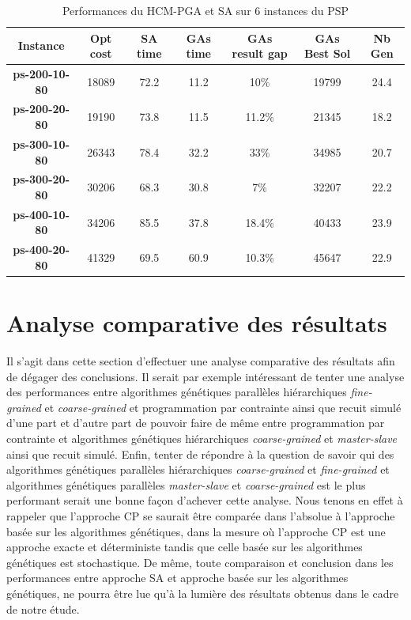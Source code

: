\documentclass[12pt,a4paper]{article}
\begin{document}
	\begin{table}[h]
		\centering
		\begin{tabular}{|c|c|c|c|c|c|c|}
			\hline
			\textbf{Instance} & \textbf{Opt cost} & \textbf{SA time} & \textbf{GAs time} & \textbf{GAs result gap} & \textbf{GAs Best Sol} & \textbf{Nb Gen}\\
			\hline
			\textbf{ps-200-10-80} & 18089 & 72.2 & 11.2 & 10\% & 19799 & 24.4 \\
			\textbf{ps-200-20-80} & 19190 & 73.8 & 11.5 & 11.2\% & 21345 & 18.2 \\
			\textbf{ps-300-10-80} & 26343 & 78.4 & 32.2 & 33\% & 34985 & 20.7 \\
			\textbf{ps-300-20-80} & 30206 & 68.3 & 30.8 & 7\% & 32207 & 22.2 \\
			\textbf{ps-400-10-80} & 34206 & 85.5 & 37.8 & 18.4\% & 40433 & 23.9 \\
			\textbf{ps-400-20-80} & 41329 & 69.5 & 60.9 & 10.3\% & 45647 & 22.9 \\
			\hline
		\end{tabular}	
		\caption{Performances du HCM-PGA et SA sur 6 instances du PSP}	
		\label{tab:hcm_pga_sa}	
	\end{table}					
	
		\section{Analyse comparative des résultats}
		Il s'agit dans cette section d'effectuer une analyse comparative des résultats afin de dégager des conclusions. Il serait par exemple intéressant de tenter une analyse des performances entre algorithmes génétiques parallèles hiérarchiques \emph{fine-grained} et \emph{coarse-grained} et programmation par contrainte ainsi que recuit simulé d'une part et d'autre part de pouvoir faire de même entre programmation par contrainte et algorithmes génétiques hiérarchiques \emph{coarse-grained} et \emph{master-slave} ainsi que recuit simulé. Enfin, tenter de répondre à la question de savoir qui des algorithmes génétiques parallèles hiérarchiques \emph{coarse-grained} et \emph{fine-grained} et algorithmes génétiques parallèles \emph{master-slave} et \emph{coarse-grained} est le plus performant serait une bonne façon d'achever cette analyse. Nous tenons en effet à rappeler que l'approche CP se saurait être comparée dans l'absolue à l'approche basée sur les algorithmes génétiques, dans la mesure où l'approche CP est une approche exacte et déterministe tandis que celle basée sur les algorithmes génétiques est stochastique. De même, toute comparaison et conclusion dans les performances entre approche SA et approche basée sur les algorithmes génétiques, ne pourra être lue qu'à la lumière des résultats obtenus dans le cadre de notre étude.
		
\end{document}

